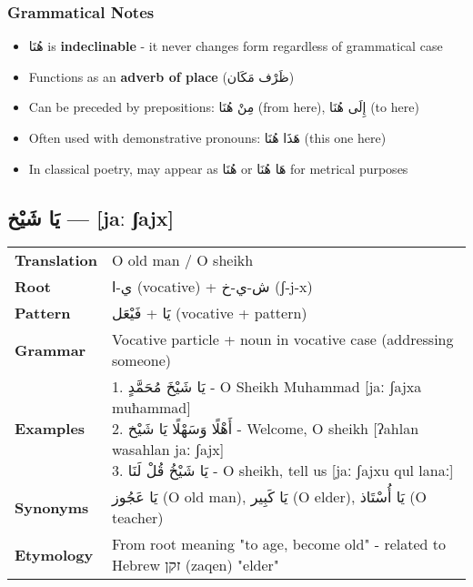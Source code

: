 \documentclass[letterpaper,12pt]{article}
\begin{document}
\subsubsection*{Grammatical Notes}
\begin{itemize}
\item \textarabic{هُنَا} is \textbf{indeclinable} - it never changes form regardless of grammatical case
\item Functions as an \textbf{adverb of place} (ظَرْف مَكَان)
\item Can be preceded by prepositions: \textarabic{مِنْ هُنَا} (from here), \textarabic{إِلَى هُنَا} (to here)
\item Often used with demonstrative pronouns: \textarabic{هَذَا هُنَا} (this one here)
\item In classical poetry, may appear as \textarabic{هُنَا} or \textarabic{هَا هُنَا} for metrical purposes
\end{itemize}

\subsection{\textarabic{يَا شَيْخ} — [jaː ʃajx]}

\begin{tabular}{p{3cm}p{10cm}}
\toprule
\textbf{Translation} & O old man / O sheikh \\
\textbf{Root} & \textarabic{ي-ا} (vocative) + \textarabic{ش-ي-خ} (ʃ-j-x) \\
\textbf{Pattern} & \textarabic{يَا} + \textarabic{فَيْعَل} (vocative + pattern) \\
\textbf{Grammar} & Vocative particle + noun in vocative case (addressing someone) \\
\textbf{Examples} & \makecell[l]{\parbox{9.5cm}{
1. \textarabic{يَا شَيْخَ مُحَمَّدٍ} - O Sheikh Muhammad [jaː ʃajxa muħammad]\\
2. \textarabic{أَهْلًا وَسَهْلًا يَا شَيْخ} - Welcome, O sheikh [ʔahlan wasahlan jaː ʃajx]\\
3. \textarabic{يَا شَيْخُ قُلْ لَنَا} - O sheikh, tell us [jaː ʃajxu qul lanaː]
}} \\
\midrule
\textbf{Synonyms} & \textarabic{يَا عَجُوز} (O old man), \textarabic{يَا كَبِير} (O elder), \textarabic{يَا أُسْتَاذ} (O teacher) \\
\textbf{Etymology} & From root meaning "to age, become old" - related to Hebrew \texthebrew{זקן} (zaqen) "elder" \\
\bottomrule
\end{tabular}
\end{document}

